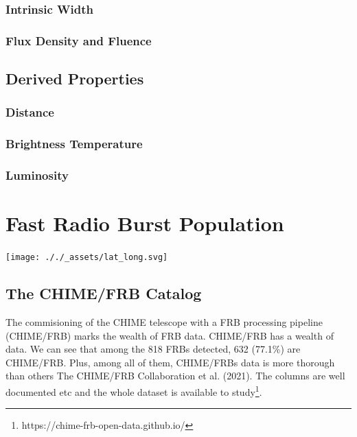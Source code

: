 \documentclass[english,singlespacedlisttitles]{umalayathesis}
\begin{document}
\hypertarget{intrinsic-width}{%
\subsection{Intrinsic Width}\label{intrinsic-width}}

\hypertarget{flux-density-and-fluence}{%
\subsection{Flux Density and Fluence}\label{flux-density-and-fluence}}

\hypertarget{derived-properties}{%
\section{Derived Properties}\label{derived-properties}}

\hypertarget{distance}{%
\subsection{Distance}\label{distance}}

\hypertarget{brightness-temperature}{%
\subsection{Brightness Temperature}\label{brightness-temperature}}

\hypertarget{luminosity}{%
\subsection{Luminosity}\label{luminosity}}


\hypertarget{fast-radio-burst-population}{%
\chapter{Fast Radio Burst
Population}\label{fast-radio-burst-population}}

\texttt{[image: ././\_assets/lat\_long.svg]}

\hypertarget{the-chimefrb-catalog}{%
\section{The CHIME/FRB Catalog}\label{the-chimefrb-catalog}}

The commisioning of the CHIME telescope with a FRB processing pipeline
(CHIME/FRB) marks the wealth of FRB data. CHIME/FRB has a wealth of
data. We can see that among the 818 FRBs detected, 632 (77.1\%) are
CHIME/FRB. Plus, among all of them, CHIME/FRBs data is more thorough
than others The CHIME/FRB Collaboration et al. (2021). The columns are
well documented etc and the whole dataset is available to
study\footnote{https://chime-frb-open-data.github.io/}.
\end{document}
